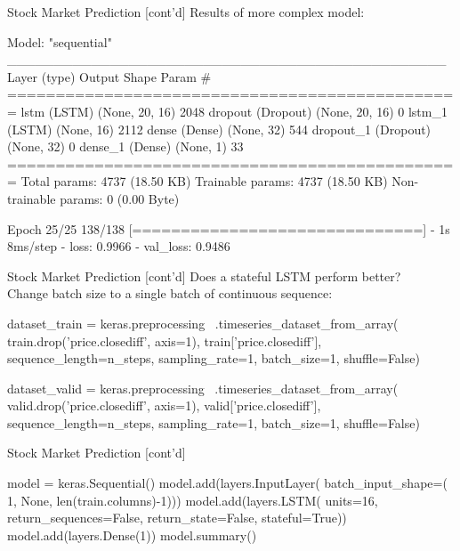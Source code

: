 \documentclass[ignorenonframetext,xcolor=x11names]{beamer}
\begin{document}
\begin{frame}[fragile]{Stock Market Prediction \small [cont'd]}
Results of more complex model:
\begin{textcode}
Model: "sequential"
_______________________________________________
 Layer (type)         Output Shape      Param #   
===============================================
 lstm (LSTM)          (None, 20, 16)    2048      
 dropout (Dropout)    (None, 20, 16)    0         
 lstm_1 (LSTM)        (None, 16)        2112      
 dense (Dense)        (None, 32)        544       
 dropout_1 (Dropout)  (None, 32)        0         
 dense_1 (Dense)      (None, 1)         33        
===============================================
Total params: 4737 (18.50 KB)
Trainable params: 4737 (18.50 KB)
Non-trainable params: 0 (0.00 Byte)

Epoch 25/25
138/138 [==============================] - 1s 8ms/step 
- loss: 0.9966 - val_loss: 0.9486
\end{textcode}
\end{frame}

\begin{frame}[fragile]{Stock Market Prediction \small [cont'd]}
Does a stateful LSTM perform better? \\

Change batch size to a single batch of continuous sequence:
\begin{pythoncode}
dataset_train = keras.preprocessing \
    .timeseries_dataset_from_array(
    train.drop('price.closediff', axis=1),
    train['price.closediff'],
    sequence_length=n_steps,
    sampling_rate=1, batch_size=1, shuffle=False)

dataset_valid = keras.preprocessing \
    .timeseries_dataset_from_array(
    valid.drop('price.closediff', axis=1),
    valid['price.closediff'],
    sequence_length=n_steps,
    sampling_rate=1, batch_size=1, shuffle=False)
\end{pythoncode}
\end{frame}

\begin{frame}[fragile]{Stock Market Prediction \small [cont'd]}
\begin{pythoncode}
model = keras.Sequential()
model.add(layers.InputLayer(
    batch_input_shape=(
        1, None, len(train.columns)-1)))
model.add(layers.LSTM(
    units=16,
    return_sequences=False,
    return_state=False,
    stateful=True))
model.add(layers.Dense(1))
model.summary()
\end{pythoncode}
\end{frame}
\end{document}
